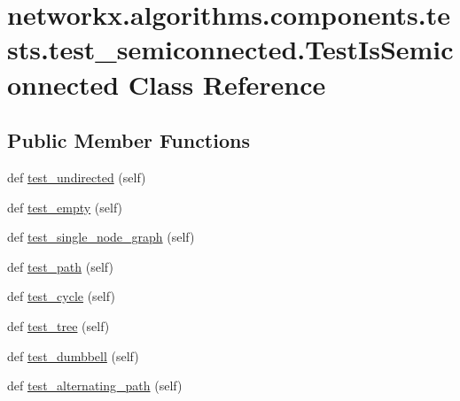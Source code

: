 \hypertarget{classnetworkx_1_1algorithms_1_1components_1_1tests_1_1test__semiconnected_1_1TestIsSemiconnected}{}\section{networkx.\+algorithms.\+components.\+tests.\+test\+\_\+semiconnected.\+Test\+Is\+Semiconnected Class Reference}
\label{classnetworkx_1_1algorithms_1_1components_1_1tests_1_1test__semiconnected_1_1TestIsSemiconnected}
\subsection*{Public Member Functions}
\begin{DoxyCompactItemize}
\item 
def \hyperlink{classnetworkx_1_1algorithms_1_1components_1_1tests_1_1test__semiconnected_1_1TestIsSemiconnected_acc8deca11a4a0ce1b3fbd5b34d128967}{test\+\_\+undirected} (self)
\item 
def \hyperlink{classnetworkx_1_1algorithms_1_1components_1_1tests_1_1test__semiconnected_1_1TestIsSemiconnected_a74b255b2158b431b142fb9e84e5f1ecc}{test\+\_\+empty} (self)
\item 
def \hyperlink{classnetworkx_1_1algorithms_1_1components_1_1tests_1_1test__semiconnected_1_1TestIsSemiconnected_a95e92706c82be5dfd2c05090b8352c80}{test\+\_\+single\+\_\+node\+\_\+graph} (self)
\item 
def \hyperlink{classnetworkx_1_1algorithms_1_1components_1_1tests_1_1test__semiconnected_1_1TestIsSemiconnected_a8c2886edef2ebb44c1f7d486405d83ae}{test\+\_\+path} (self)
\item 
def \hyperlink{classnetworkx_1_1algorithms_1_1components_1_1tests_1_1test__semiconnected_1_1TestIsSemiconnected_ad6d8471c42264137832deef65b0c332b}{test\+\_\+cycle} (self)
\item 
def \hyperlink{classnetworkx_1_1algorithms_1_1components_1_1tests_1_1test__semiconnected_1_1TestIsSemiconnected_a9bf895346426f421dcce9a7456578a8b}{test\+\_\+tree} (self)
\item 
def \hyperlink{classnetworkx_1_1algorithms_1_1components_1_1tests_1_1test__semiconnected_1_1TestIsSemiconnected_a46c166e08cc1fedc72314b76ed2b6939}{test\+\_\+dumbbell} (self)
\item 
def \hyperlink{classnetworkx_1_1algorithms_1_1components_1_1tests_1_1test__semiconnected_1_1TestIsSemiconnected_ac0316bb093fb6b7dad415633076d2ea9}{test\+\_\+alternating\+\_\+path} (self)
\end{DoxyCompactItemize}


